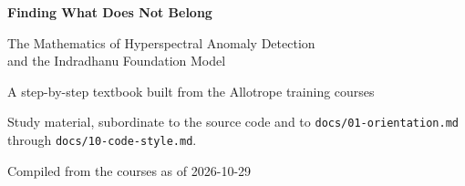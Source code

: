 \begin{titlepage}
\centering
\vspace*{30mm}
{\Huge\bfseries Finding What Does Not Belong\par}
\vspace{6mm}
{\LARGE The Mathematics of Hyperspectral Anomaly Detection\\[2mm] and the Indradhanu Foundation Model\par}
\vspace{14mm}
{\large A step-by-step textbook built from the Allotrope training courses\par}
\vspace{10mm}
\vfill
{\large Study material, subordinate to the source code and to
\texttt{docs/01-orientation.md} through \texttt{docs/10-code-style.md}.\par}
\vspace{4mm}
{\large Compiled from the courses as of 2026-10-29\par}
\vspace{10mm}
\end{titlepage}
